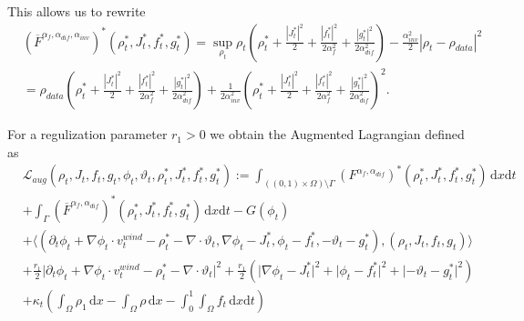This allows us to rewrite
\begin{align*}
	&(\overline{F}^{\alpha_f, \alpha_{dif},\alpha_{inv}})^*(\rho_t^*, J_t^*, f_t^*, g_t^*) = \sup_{\rho_t}\rho_t\left(\rho_t^* + \frac{|J_t^*|^2}{2} + \frac{|f_t^*|^2}{2\alpha_f^2} + \frac{|g_t^*|^2}{2\alpha_{dif}^2}\right) - \frac{\alpha_{inv}^2}{2}|\rho_t - \rho_{data}|^2\\
	&=\rho_{data}\left(\rho_t^* + \frac{|J_t^*|^2}{2} + \frac{|f_t^*|^2}{2\alpha_f^2} + \frac{|g_t^*|^2}{2\alpha_{dif}^2}\right) + \frac{1}{2\alpha_{inv}^2} \left(\rho_t^* + \frac{|J_t^*|^2}{2} + \frac{|f_t^*|^2}{2\alpha_f^2} + \frac{|g_t^*|^2}{2\alpha_{dif}^2}\right)^2.
\end{align*}

For a regulization parameter $r_1>0$ we obtain the Augmented Lagrangian defined as
\begin{align*}
	&\mathcal{L}_{aug}(\rho_t, J_t, f_t, g_t, \phi_t,\vartheta_t,\rho_t^*,J_t^*,f_t^*,g_t^*):=\int_{((0,1)\times\Omega)\setminus\Gamma} (F^{\alpha_f,\alpha_{dif}})^*(\rho_t^*,J_t^*,f_t^*,g_t^*)\,\mathrm{d}x\mathrm{d}t \\
	&+ \int_\Gamma(\overline{F}^{\alpha_f,\alpha_{dif}})^*(\rho_t^*,J_t^*,f_t^*,g_t^*)\,\mathrm{d}x\mathrm{d}t -G(\phi_t)\\ &+ \langle (\partial_t\phi_t + \nabla\phi_t\cdot v_t^{wind} - \rho_t^* - \nabla \cdot \vartheta_t, \nabla\phi_t - J_t^*, \phi_t - f_t^*, -\vartheta_t-g_t^*), (\rho_t,J_t, f_t, g_t)\rangle\\
	&+ \frac{r_1}{2} \lvert \partial_t\phi_t + \nabla\phi_t \cdot v_t^{wind} - \rho_t^* -\nabla \cdot \vartheta_t\rvert^2 +\frac{r_1}{2} (\lvert \nabla\phi_t - J_t^*\rvert^2 + \lvert \phi_t - f_t^*\rvert^2 + \lvert -\vartheta_t - g_t^*\rvert^2)\\
	&+ \kappa_t\left(\int_\Omega \rho_1\,\mathrm{d}x - \int_\Omega\rho\,\mathrm{d}x- \int_0^1\int_\Omega f_t\,\mathrm{d}x\mathrm{d}t\right)
\end{align*}

